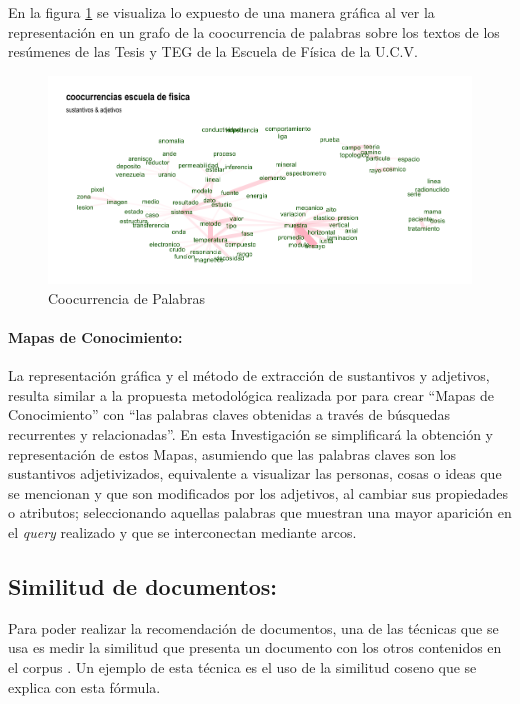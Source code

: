 \documentclass[
  12pt,
  openany]{book}
\begin{document}
En la figura \ref{fig:coocejem} se visualiza lo expuesto de una manera gráfica al ver la representación en un grafo de la coocurrencia de palabras sobre los textos de los resúmenes de las Tesis y TEG de la Escuela de Física de la U.C.V.

\begin{figure}

{\centering \includegraphics[width=0.9\linewidth]{images/03-marco-teorico/cooc} 

}

\caption{Coocurrencia de Palabras}\label{fig:coocejem}
\end{figure}

\hypertarget{mapacon}{%
\paragraph{Mapas de Conocimiento:}\label{mapacon}}

La representación gráfica y el método de extracción de sustantivos y adjetivos, resulta similar a la propuesta metodológica realizada por \citep{dueñas2011} para crear ``Mapas de Conocimiento'' con ``las palabras claves obtenidas a través de búsquedas recurrentes y relacionadas''. En esta Investigación se simplificará la obtención y representación de estos Mapas, asumiendo que las palabras claves son los sustantivos adjetivizados, equivalente a visualizar las personas, cosas o ideas que se mencionan y que son modificados por los adjetivos, al cambiar sus propiedades o atributos; seleccionando aquellas palabras que muestran una mayor aparición en el \emph{query} realizado y que se interconectan mediante arcos.

\hypertarget{similitud}{%
\subsection{Similitud de documentos:}\label{similitud}}

Para poder realizar la recomendación de documentos, una de las técnicas que se usa es medir la similitud que presenta un documento con los otros contenidos en el corpus \citep{aggarwal2018a} . Un ejemplo de esta técnica es el uso de la similitud coseno que se explica con esta fórmula.
\end{document}
